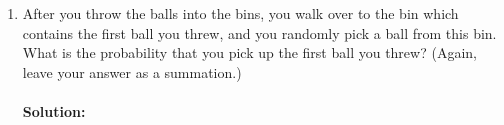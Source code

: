 \documentclass[11pt, notitlepage]{article}
\newenvironment{solution}{\paragraph{Solution:}}{\hfill \vspace{10mm}}
\begin{document}
\begin{enumerate}[label=\alph*.)]
\begin{solution}
   	The ugly little bit on the bottom is the case that half the balls are in bin 1 times the probability that half the balls are in bin 2.   	
   	\end{solution}

    \item After you throw the balls into the bins, you walk over to the bin which contains the first ball you threw, and you randomly pick a ball from this bin.
    What is the probability that you pick up the first ball you threw?
    (Again, leave your answer as a summation.)

	\begin{solution}
		
	\end{solution}
\end{enumerate}
\end{document}
